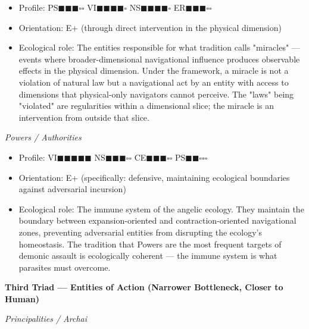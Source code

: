 \begin{itemize}[nosep,leftmargin=*]
  \item Profile: PS$\blacksquare$$\blacksquare$$\blacksquare$$\square$$\square$ VI$\blacksquare$$\blacksquare$$\blacksquare$$\blacksquare$$\square$ NS$\blacksquare$$\blacksquare$$\blacksquare$$\blacksquare$$\square$ ER$\blacksquare$$\blacksquare$$\blacksquare$$\square$$\square$
  \item Orientation: E+ (through direct intervention in the physical dimension)
  \item Ecological role: The entities responsible for what tradition calls "miracles" — events where broader-dimensional navigational influence produces observable effects in the physical dimension. Under the framework, a miracle is not a violation of natural law but a navigational act by an entity with access to dimensions that physical-only navigators cannot perceive. The "laws" being "violated" are regularities within a dimensional slice; the miracle is an intervention from outside that slice.
\end{itemize}


\textit{Powers / Authorities}

\begin{itemize}[nosep,leftmargin=*]
  \item Profile: VI$\blacksquare$$\blacksquare$$\blacksquare$$\blacksquare$$\blacksquare$ NS$\blacksquare$$\blacksquare$$\blacksquare$$\square$$\square$ CE$\blacksquare$$\blacksquare$$\blacksquare$$\square$$\square$ PS$\blacksquare$$\blacksquare$$\square$$\square$$\square$
  \item Orientation: E+ (specifically: defensive, maintaining ecological boundaries against adversarial incursion)
  \item Ecological role: The immune system of the angelic ecology. They maintain the boundary between expansion-oriented and contraction-oriented navigational zones, preventing adversarial entities from disrupting the ecology's homeostasis. The tradition that Powers are the most frequent targets of demonic assault is ecologically coherent — the immune system is what parasites must overcome.
\end{itemize}


\textbf{Third Triad — Entities of Action (Narrower Bottleneck, Closer to Human)}


\textit{Principalities / Archai}

